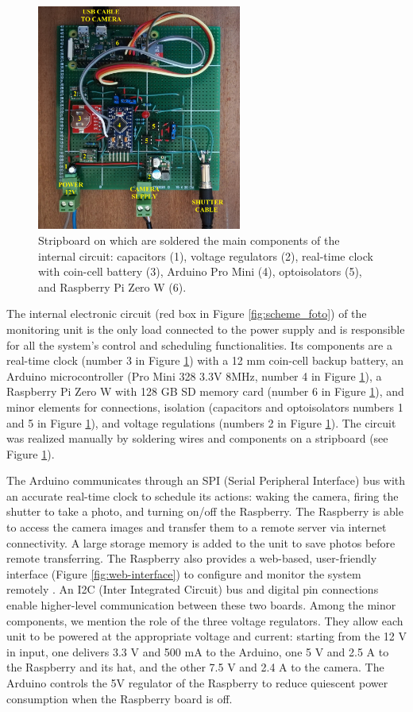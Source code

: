 \begin{figure}[ht!]
  \centering
  \includegraphics[width=0.6\textwidth]{board.jpg}
  \caption{Stripboard on which are soldered the main components of the internal
    circuit: capacitors (1), voltage regulators (2), real-time clock with coin-cell
    battery
    (3), Arduino Pro Mini (4), optoisolators (5), and Raspberry Pi Zero W (6).}
  \label{fig:circuit}
\end{figure}

The internal electronic circuit (red box in Figure \ref{fig:scheme_foto}) of the
monitoring unit is the only load connected to the power supply and is responsible for all
the system's control and scheduling functionalities.
Its components are a real-time clock (number 3 in Figure \ref{fig:circuit}) with a 12 mm
coin-cell backup battery, an Arduino microcontroller (Pro  Mini 328 3.3V 8MHz, number 4
in Figure \ref{fig:circuit}), a Raspberry Pi Zero W with 128 GB SD memory card (number 6
in Figure \ref{fig:circuit}), and minor elements for connections, isolation (capacitors
and optoisolators numbers 1 and 5 in Figure \ref{fig:circuit}), and voltage regulations
(numbers 2 in Figure \ref{fig:circuit}).
The circuit was realized manually by soldering wires and components on a stripboard (see
Figure \ref{fig:circuit}).

The Arduino communicates through an SPI (Serial Peripheral Interface) bus with an
accurate real-time clock to schedule its actions: waking the camera, firing the shutter
to take a photo, and turning on/off the Raspberry. The Raspberry is able to access the
camera images and transfer them to a remote server via internet connectivity. A large
storage memory is added to the unit to save photos before remote transferring. The
Raspberry also provides a web-based, user-friendly interface (Figure
\ref{fig:web-interface}) to configure and monitor the system remotely \citep{greig}. An
I2C (Inter Integrated Circuit) bus and digital pin connections enable higher-level
communication between these two boards. Among the minor components, we mention the role
of the three voltage regulators. They allow each unit to be powered at the appropriate
voltage and current: starting from the 12 V in input, one delivers 3.3 V and 500 mA to
the Arduino, one 5 V and 2.5 A to the Raspberry and its hat, and the other 7.5 V and 2.4
A to the camera. The Arduino controls the 5V regulator of the Raspberry to reduce
quiescent power consumption when the Raspberry board is off.

